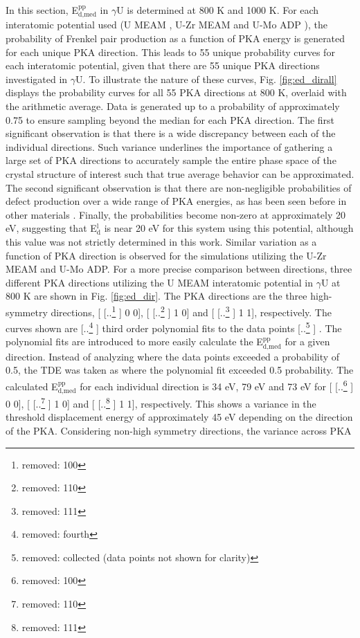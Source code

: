 \documentclass[review]{elsarticle}
\providecommand{\DIFaddtex}[1]{{\protect\color{blue} \sf #1}} %
\providecommand{\DIFdeltex}[1]{{\protect\color{red} [..\footnote{removed: #1} ]}} %
\providecommand{\DIFaddbegin}{} %
\providecommand{\DIFaddend}{} %
\providecommand{\DIFdelbegin}{} %
\providecommand{\DIFdelend}{} %
\providecommand{\DIFadd}[1]{\texorpdfstring{\DIFaddtex{#1}}{#1}} %
\providecommand{\DIFdel}[1]{\texorpdfstring{\DIFdeltex{#1}}{}} %
\newcommand{\DIFscaledelfig}{0.5}
\newlength{\DIFdelgraphicswidth} %
\newlength{\DIFdelgraphicsheight} %
\newcommand{\DIFaddincludegraphics}[2][]{{\color{blue}\fbox{\DIFOincludegraphics[#1]{#2}}}} %
\newcommand{\DIFdelincludegraphics}[2][]{%
\sbox{\DIFdelgraphicsbox}{\DIFOincludegraphics[#1]{#2}}%
\settoboxwidth{\DIFdelgraphicswidth}{\DIFdelgraphicsbox} %
\settoboxtotalheight{\DIFdelgraphicsheight}{\DIFdelgraphicsbox} %
\scalebox{\DIFscaledelfig}{%
\parbox[b]{\DIFdelgraphicswidth}{\usebox{\DIFdelgraphicsbox}\\[-\baselineskip] \rule{\DIFdelgraphicswidth}{0em}}\llap{\resizebox{\DIFdelgraphicswidth}{\DIFdelgraphicsheight}{%
\setlength{\unitlength}{\DIFdelgraphicswidth}%
\begin{picture}(1,1)%
\thicklines\linethickness{2pt} %
{\color[rgb]{1,0,0}\put(0,0){\framebox(1,1){}}}%
{\color[rgb]{1,0,0}\put(0,0){\line( 1,1){1}}}%
{\color[rgb]{1,0,0}\put(0,1){\line(1,-1){1}}}%
\end{picture}%
}\hspace*{3pt}}} %
} %
\DeclareRobustCommand{\DIFaddbegin}{\DIFOaddbegin \let\includegraphics\DIFaddincludegraphics} %
\DeclareRobustCommand{\DIFaddend}{\DIFOaddend \let\includegraphics\DIFOincludegraphics} %
\DeclareRobustCommand{\DIFdelbegin}{\DIFOdelbegin \let\includegraphics\DIFdelincludegraphics} %
\DeclareRobustCommand{\DIFdelend}{\DIFOaddend \let\includegraphics\DIFOincludegraphics} %
\begin{document}
In this section, E$^{\textrm{pp}}_{\textrm{d,med}}$ in $\gamma$U is determined at 800 K and 1000 K. For each interatomic potential used (U MEAM \cite{beeler_meam}, U-Zr MEAM \cite{moore2015} and U-Mo ADP \cite{smirnovaADP}), the probability of Frenkel pair production as a function of PKA energy is generated for each unique PKA direction. This leads to 55 unique probability curves for each interatomic potential, given that there are 55 unique PKA directions investigated in $\gamma$U. To illustrate the nature of these curves, Fig. \ref{fig:ed_dirall} displays the probability curves for all 55 PKA directions \DIFaddbegin \DIFadd{at 800 K}\DIFaddend , overlaid with the arithmetic average. Data is generated up to a probability of approximately 0.75 to ensure sampling beyond the median for each PKA direction. The first significant observation is that there is a wide discrepancy between each of the individual directions. Such variance underlines the importance of gathering a large set of PKA directions to accurately sample the entire phase space of the crystal structure of interest such that true average behavior can be approximated. The second significant observation is that there are non-negligible probabilities of defect production over a wide range of PKA energies, as has been seen before in other materials \cite{beeler2016, nordlund2006, zepeda-ruiz2003, tsuchihira2013}. Finally, the probabilities become non-zero at approximately 20 eV, suggesting that E$^{\textrm{l}}_{\textrm{d}}$ is near 20 eV for this system using this potential, although this value was not strictly determined in this work. Similar variation as a function of PKA direction is observed for the simulations utilizing the U-Zr MEAM and U-Mo ADP. For a more precise comparison between directions, three different PKA directions utilizing the U MEAM interatomic potential in $\gamma$U at 800 K are shown in Fig. \ref{fig:ed_dir}. The PKA directions are the three high-symmetry directions, [\DIFdelbegin \DIFdel{100}\DIFdelend \DIFaddbegin \DIFadd{1 0 0}\DIFaddend ], [\DIFdelbegin \DIFdel{110}\DIFdelend \DIFaddbegin \DIFadd{1 1 0}\DIFaddend ] and [\DIFdelbegin \DIFdel{111}\DIFdelend \DIFaddbegin \DIFadd{1 1 1}\DIFaddend ], respectively. The curves shown are \DIFdelbegin \DIFdel{fourth }\DIFdelend \DIFaddbegin \DIFadd{third }\DIFaddend order polynomial fits to the data points\DIFdelbegin \DIFdel{collected (data points not shown for clarity)}\DIFdelend \DIFaddbegin \DIFadd{. The polynomial fits are introduced to more easily calculate the E$^{\textrm{pp}}_{\textrm{d,med}}$ for a given direction. Instead of analyzing where the data points exceeded a probability of 0.5, the TDE was taken as where the polynomial fit exceeded 0.5 probability}\DIFaddend . The calculated E$^{\textrm{pp}}_{\textrm{d,med}}$ for each individual direction is 34 eV, 79 eV and 73 eV for [\DIFdelbegin \DIFdel{100}\DIFdelend \DIFaddbegin \DIFadd{1 0 0}\DIFaddend ], [\DIFdelbegin \DIFdel{110}\DIFdelend \DIFaddbegin \DIFadd{1 1 0}\DIFaddend ] and [\DIFdelbegin \DIFdel{111}\DIFdelend \DIFaddbegin \DIFadd{1 1 1}\DIFaddend ], respectively. This shows a variance in the \DIFaddbegin \DIFadd{threshold }\DIFaddend displacement energy of approximately 45 eV depending on the direction of the PKA. Considering non-high symmetry directions, the variance across PKA 
\end{document}
